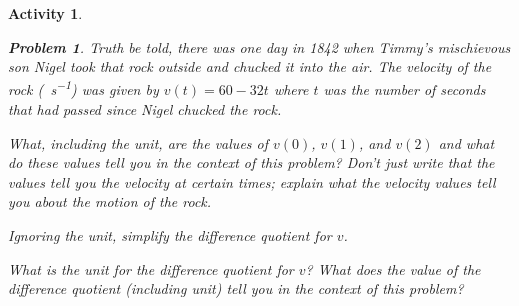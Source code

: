 \documentclass[12pt]{article}
\theoremstyle{activity}
\newtheorem{activity}{Activity}
\theoremstyle{problem}
\newtheorem{problem}{Problem}
\theoremstyle{example}
\theoremstyle{definition}
\theoremstyle{exercises}
\theoremstyle{exercise}
\begin{document}
\begin{activity}
\begin{problem}
Truth be told, there was one day in 1842 when Timmy's mischievous son Nigel took that rock outside and chucked it into the air. The
velocity of the rock (\si{\foot\per\second}) was given by $v(t)=60-32t$ where $t$ was the number of seconds that had passed since Nigel chucked the rock. 
\begin{parts}
\item What, including the unit, are the values of $v(0)$, $v(1)$, and $v(2)$ and what do these values tell you in the context of this problem? Don't just write that the values tell you the velocity at certain times; explain what the velocity values tell you about the motion of the rock. 
\item Ignoring the unit, simplify the difference quotient for $v$.
\item  What is the unit for the difference quotient for $v$? What does the value of the difference quotient (including unit) tell you in
the context of this problem?  
\end{parts}
\end{problem}


\end{activity}
\end{document}
